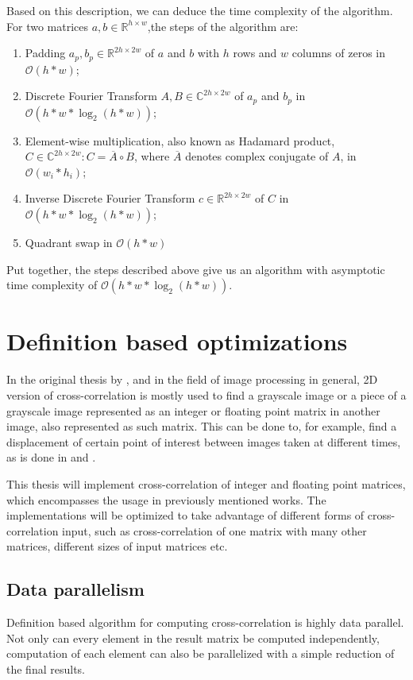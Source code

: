 Based on this description, we can deduce the time complexity of the algorithm. For two matrices $a,b \in \mathbb{R}^{h \times w}$,the steps of the algorithm are:
\begin{enumerate}
	\item Padding $a_p, b_p \in \mathbb{R}^{2h \times 2w}$ of $a$ and $b$ with $h$ rows and $w$ columns of zeros in $\mathcal{O}(h*w)$;
	\item Discrete Fourier Transform $A,B 
	\in \mathbb{C}^{2h \times 2w}$ of $a_p$ and $b_p$ in $\mathcal{O}(h*w*\log_2(h*w))$;
	\item Element-wise multiplication, also known as Hadamard product, $C \in \mathbb{C}^{2h \times 2w}: C = \overline{A} \circ B$, where $\overline{A}$ denotes complex conjugate of $A$, in $\mathcal{O}(w_i*h_i)$;
	\item Inverse Discrete Fourier Transform $c \in \mathbb{R}^{2h \times 2w}$ of $C$ in $\mathcal{O}(h*w*\log_2(h*w))$;
	\item Quadrant swap in $\mathcal{O}(h*w)$
\end{enumerate}

Put together, the steps described above give us an algorithm with asymptotic time complexity of $\mathcal{O}(h*w*\log_2(h*w))$.

\section{Definition based optimizations}
\label{sec:cross_corr_opt}
In the original thesis by \citep{misko}, and in the field of image processing in general, 2D version of cross-correlation is mostly used to find a grayscale image or a piece of a grayscale image represented as an integer or floating point matrix in another image, also represented as such matrix. This can be done to, for example, find a displacement of certain point of interest between images taken at different times, as is done in \citet{misko} and \citet{zhang2015}. 

This thesis will implement cross-correlation of integer and floating point matrices, which encompasses the usage in previously mentioned works. The implementations will be optimized to take advantage of different forms of cross-correlation input, such as cross-correlation of one matrix with many other matrices, different sizes of input matrices etc. 

\subsection{Data parallelism}
\label{sec:cross_corr_para}
Definition based algorithm for computing cross-correlation is highly data parallel. Not only can every element in the result matrix be computed independently, computation of each element can also be parallelized with a simple reduction of the final results.

